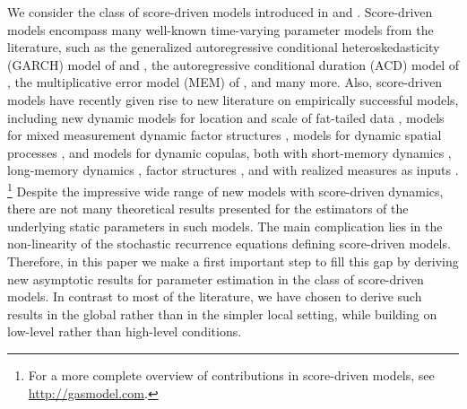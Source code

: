 \noindent  We consider the class of score-driven models introduced in \citet{CKL2011,CKL2013} and \citet{harvey2013}. 
Score-driven models encompass many well-known time-varying parameter models from the literature, such as the generalized autoregressive conditional heteroskedasticity (GARCH) model of \citet{Engle82A} and \citet{Bollerslev86}, the autoregressive conditional duration (ACD) model of \citet{EngleRussell1998}, the multiplicative error model (MEM) of \cite{Engle2002}, and many more. 
Also, score-driven models have recently given rise to 
new literature on empirically successful models, including 
new dynamic models for location and scale of fat-tailed data \citep{harveyluati2014}, 
models for mixed measurement dynamic factor structures \citep{cskl2014},
models for dynamic spatial processes \citep{blasques2016,catania2017},
and 
models for dynamic copulas, 
both with short-memory dynamics \citep{CKL2011, lucasschwaabzhang2014, lucasschwaabzhang2017},
long-memory dynamics \citep{jkl2014}, 
factor structures \citep{ohpatton2017b},
and with realized measures as inputs \citep{delirasalvatierrapatton2015,opschoor2017}.%
\footnote{%
	For a more complete overview of contributions in score-driven models, see \href{http://gasmodel.com}{http://gasmodel.com}.
} %
Despite the impressive wide range of new models with score-driven dynamics, 
there are not many theoretical results presented
for the estimators of the underlying static parameters in such models. The main complication lies in the non-linearity of the stochastic recurrence equations defining score-driven models. Therefore, in this paper we make a first important step to fill this gap by deriving new asymptotic results for parameter estimation in the class of score-driven models. In contrast to most of the literature, we have chosen to derive such results in the global rather than in the simpler local setting, while building on low-level rather than high-level conditions.

